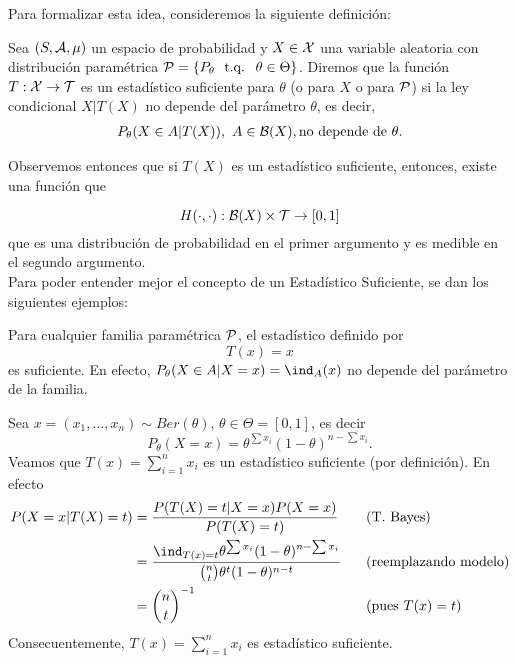 Para formalizar esta idea, consideremos la siguiente definición:

\begin{definition}
\label{def:estadístico_suficiente}
Sea $(S,{\mathcal A},\mu)$ un espacio de probabilidad y $X\in{\mathcal X}$ una variable aleatoria con distribución paramétrica $\cP = \{P_\theta\ \tq\ \theta\in\Theta\}$. Diremos que la función $T:{\mathcal X}\rightarrow{\mathcal T}$ es un estadístico suficiente para $\theta$ (o para $X$ o para ${\mathcal P}$) si la ley condicional $X|T(X)$ no depende del parámetro $\theta$, es decir, 
\begin{align}
\nonumber
	P_\theta(X\in A | T(X)),\ A\in{\mathcal B}(X), \text{no depende de }\theta.
\end{align} 
\end{definition}

Observemos entonces que si $T(X)$ es un estadístico suficiente, entonces, existe una función que

\begin{equation}
\nonumber
	H(\cdot,\cdot): {\mathcal B}(X)\times{\mathcal T} \rightarrow [0,1]
\end{equation}
que es una distribución de probabilidad en el primer argumento y es medible en el segundo argumento.\\

Para poder entender mejor el concepto de un Estadístico Suficiente, se dan los siguientes ejemplos:

\begin{example}
	\label{ex:suficiencia_trivial}
	Para cualquier familia paramétrica ${\mathcal P}$, el estadístico definido por
	\begin{equation}
	\nonumber
		T(x) = x
	\end{equation}
es suficiente. En efecto, $P_\theta(X\in A|X=x) = \ind_{A}(x)$ no depende del parámetro de la familia. 
\end{example}

\begin{example}
	Sea $x=(x_1,\ldots,x_n) \sim Ber(\theta)$, $\theta \in \Theta = [0,1]$, es decir
	\begin{equation}
	\nonumber
		P_\theta(X=x) = \theta^{\sum x_i}(1-\theta)^{n-\sum x_i}.
	\end{equation}
	Veamos que $T(x) = \sum\limits_{i=1}^{n} x_i$ es un estadístico suficiente (por definición). En efecto
	\begin{alignat*}{3}
		P(X=x|T(X)=t) 	&= \frac{P(T(X)=t| X=x )P( X=x )}{P(T(X)=t)} \quad&&\text{(T. Bayes)}\\
						&= \frac{\ind_{T(x)=t}\theta^{\sum x_i}(1-\theta)^{n-\sum x_i}}{\binom{n}{t}\theta^t(1-\theta)^{n-t}} &&\text{(reemplazando modelo)}\\
						&= \binom{n}{t}^{-1} && \text{(pues $T(x)=t$)}
	\end{alignat*}
	Consecuentemente, $T(x)=\sum\limits_{i=1}^{n} x_i$ es estadístico suficiente.
\end{example}

